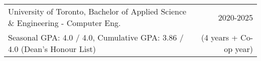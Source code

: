 \begin{tabularx}{\textwidth}{ @{}X r@{} }
    University of Toronto, Bachelor of Applied Science \& Engineering - Computer Eng. & 2020-2025 \\
    Seasonal GPA: 4.0 / 4.0, Cumulative GPA: 3.86 / 4.0 (Dean’s Honour List) & (4 years + Co-op year) \\
\end{tabularx}